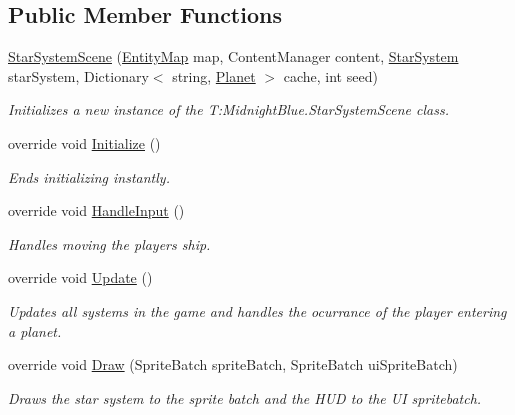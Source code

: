\subsection*{Public Member Functions}
\begin{DoxyCompactItemize}
\item 
\hyperlink{class_midnight_blue_1_1_star_system_scene_a630b2de039b719d35fbdf572bbc69ea0}{Star\+System\+Scene} (\hyperlink{class_m_b2_d_1_1_entity_component_1_1_entity_map}{Entity\+Map} map, Content\+Manager content, \hyperlink{class_midnight_blue_1_1_star_system}{Star\+System} star\+System, Dictionary$<$ string, \hyperlink{class_midnight_blue_1_1_planet}{Planet} $>$ cache, int seed)
\begin{DoxyCompactList}\small\item\em Initializes a new instance of the T\+:\+Midnight\+Blue.\+Star\+System\+Scene class. \end{DoxyCompactList}\item 
override void \hyperlink{class_midnight_blue_1_1_star_system_scene_a1b593cd45d0f1b6c02f17ec5dd1033ca}{Initialize} ()
\begin{DoxyCompactList}\small\item\em Ends initializing instantly. \end{DoxyCompactList}\item 
override void \hyperlink{class_midnight_blue_1_1_star_system_scene_a9fd64901322082a4da8658650257163d}{Handle\+Input} ()
\begin{DoxyCompactList}\small\item\em Handles moving the players ship. \end{DoxyCompactList}\item 
override void \hyperlink{class_midnight_blue_1_1_star_system_scene_ac36506b721064e015a9f93140681d93a}{Update} ()
\begin{DoxyCompactList}\small\item\em Updates all systems in the game and handles the ocurrance of the player entering a planet. \end{DoxyCompactList}\item 
override void \hyperlink{class_midnight_blue_1_1_star_system_scene_ac3d90fb8d914d15b912f5da3cc1aa8a0}{Draw} (Sprite\+Batch sprite\+Batch, Sprite\+Batch ui\+Sprite\+Batch)
\begin{DoxyCompactList}\small\item\em Draws the star system to the sprite batch and the H\+UD to the UI spritebatch. \end{DoxyCompactList}\item 

\end{DoxyCompactItemize}
